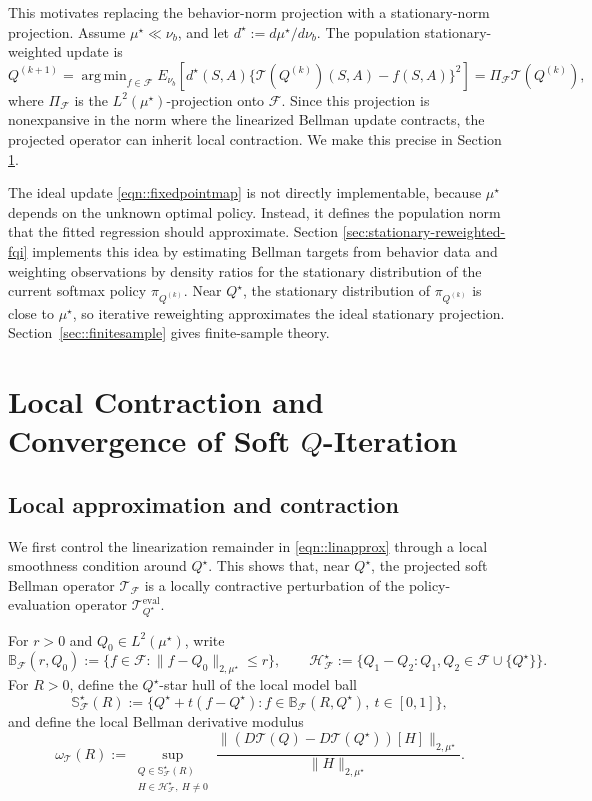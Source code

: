\documentclass{article}
\DeclareMathOperator*{\argmin}{arg\,min}
\theoremstyle{plain}
\theoremstyle{definition}
\theoremstyle{remark}
\begin{document}
This motivates replacing the behavior-norm projection with a stationary-norm
projection. Assume \(\mu^\star\ll\nu_b\), and let
\(d^\star:=d\mu^\star/d\nu_b\). The population stationary-weighted update is
\begin{equation}
Q^{(k+1)}
=
\argmin_{f\in\mathcal F}
E_{\nu_b}\!\left[
d^\star(S,A)\{\mathcal T(Q^{(k)})(S,A)-f(S,A)\}^2
\right]
=
\Pi_{\mathcal F}\mathcal T(Q^{(k)}),
\label{eqn::fixedpointmap}
\end{equation}
where \(\Pi_{\mathcal F}\) is the \(L^2(\mu^\star)\)-projection onto
\(\mathcal F\).  Since this projection is nonexpansive in the norm where the
linearized Bellman update contracts, the projected operator can inherit local
contraction. We make this precise in Section \ref{sec:local-geometry}. 

The ideal update \eqref{eqn::fixedpointmap} is not directly implementable,
because \(\mu^\star\) depends on the unknown optimal policy. Instead, it defines
the population norm that the fitted regression should approximate. Section
\ref{sec:stationary-reweighted-fqi} implements this idea by estimating Bellman
targets from behavior data and weighting observations by density ratios for the
stationary distribution of the current softmax policy \(\pi_{Q^{(k)}}\). Near
\(Q^\star\), the stationary distribution of \(\pi_{Q^{(k)}}\) is close to
\(\mu^\star\), so iterative reweighting approximates the ideal stationary
projection. Section~\ref{sec::finitesample} gives finite-sample theory.

\section{Local Contraction and Convergence of Soft \(Q\)-Iteration}
\label{sec:local-geometry}
\subsection{Local approximation and contraction}
 

We first control the linearization remainder in \eqref{eqn::linapprox} through a
local smoothness condition around \(Q^\star\). This shows that, near
\(Q^\star\), the projected soft Bellman operator \(\mathcal T_{\mathcal F}\) is
a locally contractive perturbation of the policy-evaluation operator
\(\mathcal T^{\mathrm{eval}}_{Q^\star}\).

For \(r>0\) and \(Q_0\in L^2(\mu^\star)\), write
\[
\mathbb B_{\mathcal F}(r,Q_0)
:=
\{f\in\mathcal F:\|f-Q_0\|_{2,\mu^\star}\le r\},
\qquad
\mathcal H_{\mathcal F}^\star
:=
\{Q_1-Q_2:Q_1,Q_2\in\mathcal F\cup\{Q^\star\}\}.
\]
For \(R>0\), define the \(Q^\star\)-star hull of the local model ball
\[
\mathbb S_{\mathcal F}^\star(R)
:=
\{Q^\star+t(f-Q^\star):f\in\mathbb B_{\mathcal F}(R,Q^\star),\ t\in[0,1]\},
\]
and define the local Bellman derivative modulus
\[
\omega_{\mathcal T}(R)
:=
\sup_{\substack{
Q\in\mathbb S_{\mathcal F}^\star(R)\\
H\in\mathcal H_{\mathcal F}^\star,\ H\ne0}}
\frac{
\|(D\mathcal T(Q)-D\mathcal T(Q^\star))[H]\|_{2,\mu^\star}
}{
\|H\|_{2,\mu^\star}
}.
\]
\end{document}
